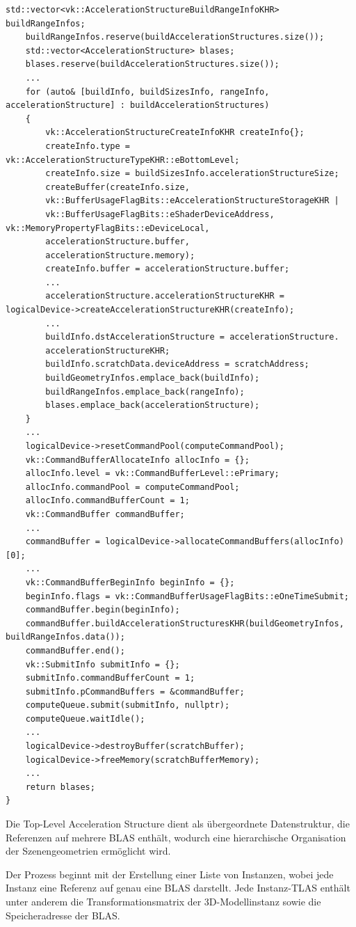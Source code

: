 \documentclass[11pt]{scrartcl}
\begin{document}
\begin{lstlisting}[caption={Erzeugung der Bottom-Level Acceleration Structures in VulkanRenderer.cpp},label={lst:listing-vulkan-createblascpp}]
	std::vector<vk::AccelerationStructureBuildRangeInfoKHR> buildRangeInfos;
	buildRangeInfos.reserve(buildAccelerationStructures.size());
	std::vector<AccelerationStructure> blases;
	blases.reserve(buildAccelerationStructures.size());
	...
	for (auto& [buildInfo, buildSizesInfo, rangeInfo, accelerationStructure] : buildAccelerationStructures)
	{
		vk::AccelerationStructureCreateInfoKHR createInfo{};
		createInfo.type = vk::AccelerationStructureTypeKHR::eBottomLevel;
		createInfo.size = buildSizesInfo.accelerationStructureSize;
		createBuffer(createInfo.size,
		vk::BufferUsageFlagBits::eAccelerationStructureStorageKHR |
		vk::BufferUsageFlagBits::eShaderDeviceAddress, vk::MemoryPropertyFlagBits::eDeviceLocal,
		accelerationStructure.buffer,
		accelerationStructure.memory);
		createInfo.buffer = accelerationStructure.buffer;
		...
		accelerationStructure.accelerationStructureKHR = logicalDevice->createAccelerationStructureKHR(createInfo);
		...
		buildInfo.dstAccelerationStructure = accelerationStructure.
		accelerationStructureKHR;
		buildInfo.scratchData.deviceAddress = scratchAddress;
		buildGeometryInfos.emplace_back(buildInfo);
		buildRangeInfos.emplace_back(rangeInfo);
		blases.emplace_back(accelerationStructure);
	}
	...
	logicalDevice->resetCommandPool(computeCommandPool);
	vk::CommandBufferAllocateInfo allocInfo = {};
	allocInfo.level = vk::CommandBufferLevel::ePrimary;
	allocInfo.commandPool = computeCommandPool;
	allocInfo.commandBufferCount = 1;
	vk::CommandBuffer commandBuffer;
	...
	commandBuffer = logicalDevice->allocateCommandBuffers(allocInfo)[0];
	...
	vk::CommandBufferBeginInfo beginInfo = {};
	beginInfo.flags = vk::CommandBufferUsageFlagBits::eOneTimeSubmit;
	commandBuffer.begin(beginInfo);
	commandBuffer.buildAccelerationStructuresKHR(buildGeometryInfos, buildRangeInfos.data());
	commandBuffer.end();
	vk::SubmitInfo submitInfo = {};
	submitInfo.commandBufferCount = 1;
	submitInfo.pCommandBuffers = &commandBuffer;
	computeQueue.submit(submitInfo, nullptr);
	computeQueue.waitIdle();
	...
	logicalDevice->destroyBuffer(scratchBuffer);
	logicalDevice->freeMemory(scratchBufferMemory);
	...
	return blases;
}	\end{lstlisting}
	
	Die Top-Level Acceleration Structure dient als übergeordnete Datenstruktur, die Referenzen auf mehrere BLAS enthält, wodurch eine hierarchische Organisation der Szenengeometrien ermöglicht wird.
	
	Der Prozess beginnt mit der Erstellung einer Liste von Instanzen, wobei jede Instanz eine Referenz auf genau eine BLAS darstellt. Jede Instanz-TLAS enthält unter anderem die Transformationsmatrix der 3D-Modellinstanz sowie die Speicheradresse der BLAS.
	
\end{document}
